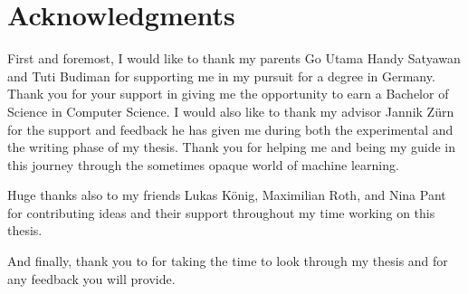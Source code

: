 \chapter{Acknowledgments}

First and foremost, I would like to thank my parents Go Utama Handy Satyawan and Tuti Budiman for supporting me in my pursuit for a degree in Germany. Thank you for your support in giving me the opportunity to earn a Bachelor of Science in Computer Science.
I would also like to thank my advisor Jannik Zürn for the support and feedback he has given me during both the experimental and the writing phase of my thesis.
Thank you for helping me and being my guide in this journey through the sometimes opaque world of machine learning.

Huge thanks also to my friends Lukas König, Maximilian Roth, and Nina Pant for contributing ideas and their support throughout my time working on this thesis.

And finally, thank you to  for taking the time to look through my thesis and for any feedback you will provide.